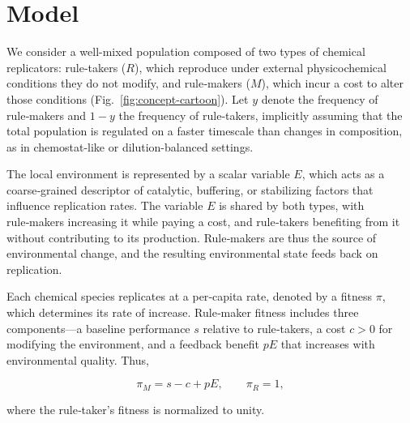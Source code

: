 \section{Model}

We consider a well-mixed population composed of two types of chemical replicators: rule‑takers ($R$), which reproduce under external physicochemical conditions they do not modify, and rule‑makers ($M$), which incur a cost to alter those conditions (Fig.~\ref{fig:concept-cartoon}). Let $y$ denote the frequency  of rule‑makers  and $1-y$ the frequency of rule‑takers, implicitly assuming that the total population is regulated on a faster timescale than changes in composition, as in chemostat-like or dilution-balanced settings.  

The local environment is represented by a scalar variable $E$, which acts as a coarse‑grained descriptor of catalytic, buffering, or stabilizing factors that influence replication rates. The variable $E$ is shared by both types, with rule‑makers increasing it while paying a cost, and rule‑takers benefiting from it without contributing to its production. Rule‑makers are thus the source of environmental change, and the resulting environmental state feeds back on replication. 

Each chemical species replicates at a per‑capita rate, denoted by a fitness $\pi$, which determines its rate of increase. Rule‑maker fitness includes three components—a baseline performance $s$ relative to rule‑takers, a cost $c>0$ for modifying the environment, and a feedback benefit $pE$ that increases with environmental quality. Thus,

\begin{equation}
\pi_M = s - c + pE, \qquad \pi_R = 1,
\label{eq:piM}
\end{equation}

where the rule‑taker’s fitness is normalized to unity. 


